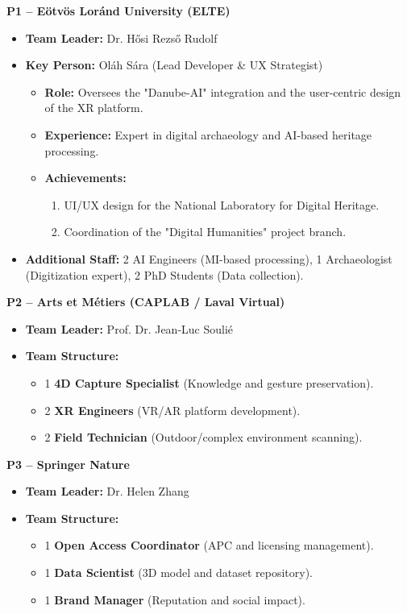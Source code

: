 \textbf{P1 – Eötvös Loránd University (ELTE)}
\begin{itemize}
  \item \textbf{Team Leader:} Dr. Hősi Rezső Rudolf
  \item \textbf{Key Person:} Oláh Sára (Lead Developer \& UX Strategist)
    \begin{itemize}
      \item \textbf{Role:} Oversees the "Danube-AI" integration and the user-centric design of the XR platform.
      \item \textbf{Experience:} Expert in digital archaeology and AI-based heritage processing.
      \item \textbf{Achievements:}
      \begin{enumerate}
        \item UI/UX design for the National Laboratory for Digital Heritage.
        \item Coordination of the "Digital Humanities" project branch.
      \end{enumerate}
    \end{itemize}
  \item \textbf{Additional Staff:} 2 AI Engineers (MI-based processing), 1 Archaeologist (Digitization expert), 2 PhD Students (Data collection).
\end{itemize}

\noindent
\textbf{P2 – Arts et Métiers (CAPLAB / Laval Virtual)}
\begin{itemize}
  \item \textbf{Team Leader:} Prof. Dr. Jean-Luc Soulié
  \item \textbf{Team Structure:} 
    \begin{itemize}
      \item 1 \textbf{4D Capture Specialist} (Knowledge and gesture preservation).
      \item 2 \textbf{XR Engineers} (VR/AR platform development).
      \item 2 \textbf{Field Technician} (Outdoor/complex environment scanning).
    \end{itemize}
\end{itemize}

\noindent
\textbf{P3 – Springer Nature}
\begin{itemize}
  \item \textbf{Team Leader:} Dr. Helen Zhang
  \item \textbf{Team Structure:} 
    \begin{itemize}
      \item 1 \textbf{Open Access Coordinator} (APC and licensing management).
      \item 1 \textbf{Data Scientist} (3D model and dataset repository).
      \item 1 \textbf{Brand Manager} (Reputation and social impact).
    \end{itemize}
\end{itemize}

